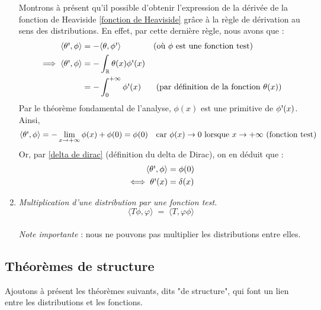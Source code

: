 \documentclass[../notesdecours.tex]{subfiles}
\begin{document}
\begin{enumerate}
    Montrons à présent qu'il possible d'obtenir l'expression de la dérivée de la fonction de Heaviside \ref{fonction de Heaviside} grâce à la règle de dérivation au sens des distributions. En effet, par cette dernière règle, nous avons que : 
    \begin{align}
        \langle \theta \mbox{\textquotesingle}, \phi\rangle  &= -\langle \theta, \phi \mbox{\textquotesingle}\rangle  && \mbox{(où $\phi$ est une fonction test)} \notag \\
        \implies \langle \theta \mbox{\textquotesingle}, \phi\rangle  &= - \int_{\mathbb{R}} \theta(x) \phi \mbox{\textquotesingle}(x) \notag \\
        &= - \int_0^{+ \infty} \phi \mbox{\textquotesingle}(x) && \mbox{ (par définition de la fonction $\theta(x)$)} \notag 
    \end{align}
    Par le théorème fondamental de l'analyse, $\phi(x)$ est une primitive de $\phi \mbox{\textquotesingle} (x)$. Ainsi, 
    \begin{equation} 
        \langle \theta \mbox{\textquotesingle}, \phi\rangle  = - \lim_{x \to +\infty} \phi(x) + \phi(0) = \phi(0) \quad \mbox{car $\phi(x) \to 0$ lorsque $x \to +\infty$ (fonction test)}
    \end{equation} 
    Or, par \ref{delta de dirac} (définition du delta de Dirac), on en déduit que : 
    \begin{align}
        \langle \theta \mbox{\textquotesingle}, \phi\rangle  &= \phi(0) \notag \\ 
        \iff \theta \mbox{\textquotesingle} (x) &= \delta (x)
    \end{align}
    \item \textit{Multiplication d'une distribution par une fonction test.} $$\langle  T\phi, \varphi \rangle  \; = \; \langle T, \varphi \phi\rangle $$\\
    \textit{Note importante} : nous ne pouvons pas multiplier les distributions entre elles.
\end{enumerate}

\subsection{Théorèmes de structure}
Ajoutons à présent les théorèmes suivants, dits "de structure", qui font un lien entre les distributions et les fonctions.
\end{document}
